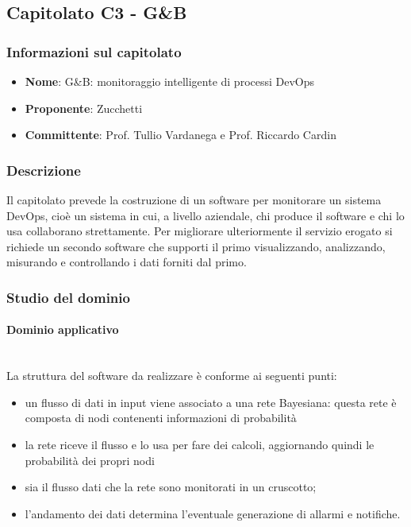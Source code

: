 \subsection{Capitolato C3 - G\&B}
\subsubsection{Informazioni sul capitolato}
\begin{itemize}
	\item \textbf{Nome}: G\&B: monitoraggio intelligente di processi DevOps
	\item \textbf{Proponente}: Zucchetti
	\item \textbf{Committente}: Prof. Tullio Vardanega e Prof. Riccardo Cardin
\end{itemize}
\subsubsection{Descrizione}
Il capitolato prevede la costruzione di un software per monitorare un sistema 
DevOps, cioè un sistema in cui, a livello aziendale, chi produce il software 
e chi lo usa collaborano strettamente. Per migliorare ulteriormente il servizio 
erogato si richiede un secondo software che supporti il primo visualizzando, 
analizzando, misurando e controllando i dati forniti dal primo.
\subsubsection{Studio del dominio}
\paragraph{Dominio applicativo} \mbox{}\\
La struttura del software da realizzare è conforme ai seguenti punti: 
\begin{itemize}
	\item un flusso di dati in input viene associato a una rete Bayesiana: 
	questa rete è composta di nodi contenenti informazioni di probabilità
	\item la rete riceve il flusso e lo usa per fare dei calcoli, aggiornando
	 quindi le probabilità dei propri nodi
	\item sia il flusso dati che la rete sono monitorati in un cruscotto;
	\item l'andamento dei dati determina l'eventuale generazione di allarmi
	 e notifiche.
\end{itemize}
